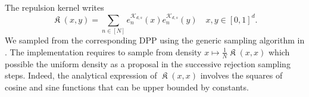 \documentclass[twoside,11pt]{book}
\numberwithin{theorem}{chapter}
\numberwithin{definition}{chapter}
\numberwithin{proposition}{chapter}
\numberwithin{corollary}{chapter}
\numberwithin{example}{chapter}
\numberwithin{lemma}{chapter}
\numberwithin{assumption}{chapter}
\DeclareMathOperator*{\KDPP}{\mathfrak{K}}
\begin{document}






The repulsion kernel writes
\begin{equation}
\KDPP(x,y) =\sum\limits_{n \in [N]} e_{n}^{\mathcal{K}_{d,s}}(x)e_{n}^{\mathcal{K}_{d,s}}(y)  \quad x,y\in [0,1]^d.
\end{equation}
We sampled from the corresponding DPP using the generic sampling algorithm in \cite{HoKrPeVi06}. The implementation requires to sample from density $x \mapsto \frac{1}{N} \KDPP(x,x)$ which possible the uniform density as a proposal in the successive rejection sampling steps. Indeed, the analytical expression of $\KDPP(x,x)$ involves the squares of cosine and sine functions that can be upper bounded by constants.
\end{document}
